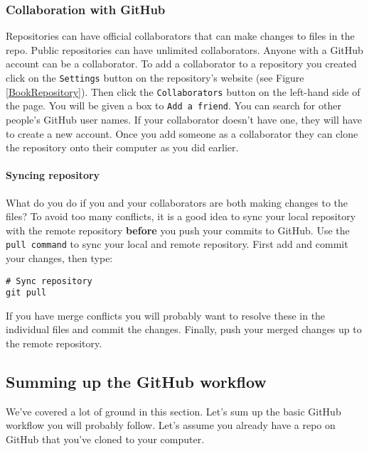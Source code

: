\subsubsection{Collaboration with GitHub}

Repositories can have official collaborators that can make changes to files in the repo. Public repositories can have unlimited collaborators. Anyone with a GitHub account can be a collaborator. To add a collaborator to a repository you created click on the \texttt{Settings} button on the repository's website (see Figure \ref{BookRepository}). Then click the \texttt{Collaborators} button on the left-hand side of the page. You will be given a box to \texttt{Add a friend}. You can search for other people's GitHub user names. If your collaborator doesn't have one, they will have to create a new account. Once you add someone as a collaborator they can clone the repository onto their computer as you did earlier.

\paragraph{Syncing repository}

What do you do if you and your collaborators are both making changes to the files? To avoid too many conflicts, it is a good idea to sync your local repository with the remote repository \textbf{before} you push your commits to GitHub. Use the \texttt{pull command} to sync your local and remote repository. First add and commit your changes, then type:

\begin{knitrout}
\color{fgcolor}\begin{kframe}
\begin{verbatim}
# Sync repository
git pull 
\end{verbatim}
\end{kframe}
\end{knitrout}


\noindent If you have merge conflicts you will probably want to resolve these in the individual files and commit the changes. Finally, push your merged changes up to the remote repository.

\subsection{Summing up the GitHub workflow}

We've covered a lot of ground in this section. Let's sum up the basic GitHub workflow you will probably follow. Let's assume you already have a repo on GitHub that you've cloned to your computer. 

